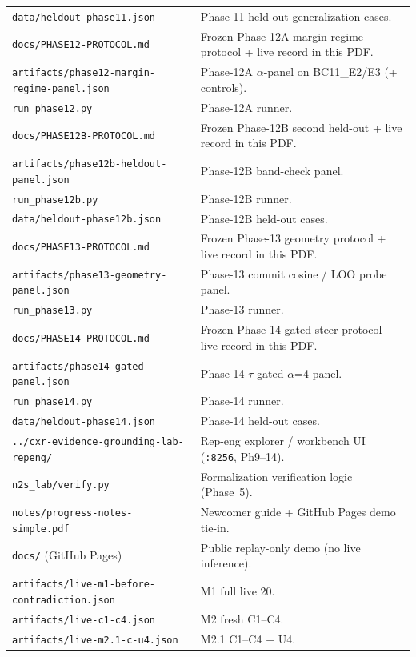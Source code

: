 \documentclass[11pt,a4paper]{article}
\begin{document}
\begin{tabularx}{\textwidth}{@{}l Y@{}}
\texttt{data/heldout-phase11.json} & Phase-11 held-out generalization cases. \\
\texttt{docs/PHASE12-PROTOCOL.md} & Frozen Phase-12A margin-regime protocol + live record in this PDF. \\
\texttt{artifacts/phase12-margin-regime-panel.json} & Phase-12A $\alpha$-panel on BC11\_E2/E3 (+ controls). \\
\texttt{run\_phase12.py} & Phase-12A runner. \\
\texttt{docs/PHASE12B-PROTOCOL.md} & Frozen Phase-12B second held-out + live record in this PDF. \\
\texttt{artifacts/phase12b-heldout-panel.json} & Phase-12B band-check panel. \\
\texttt{run\_phase12b.py} & Phase-12B runner. \\
\texttt{data/heldout-phase12b.json} & Phase-12B held-out cases. \\
\texttt{docs/PHASE13-PROTOCOL.md} & Frozen Phase-13 geometry protocol + live record in this PDF. \\
\texttt{artifacts/phase13-geometry-panel.json} & Phase-13 commit cosine / LOO probe panel. \\
\texttt{run\_phase13.py} & Phase-13 runner. \\
\texttt{docs/PHASE14-PROTOCOL.md} & Frozen Phase-14 gated-steer protocol + live record in this PDF. \\
\texttt{artifacts/phase14-gated-panel.json} & Phase-14 $\tau$-gated $\alpha$=4 panel. \\
\texttt{run\_phase14.py} & Phase-14 runner. \\
\texttt{data/heldout-phase14.json} & Phase-14 held-out cases. \\
\texttt{../cxr-evidence-grounding-lab-repeng/} & Rep-eng explorer / workbench UI (\texttt{:8256}, Ph9--14). \\
\texttt{n2s\_lab/verify.py} & Formalization verification logic (Phase~5). \\
\texttt{notes/progress-notes-simple.pdf} & Newcomer guide + GitHub Pages demo tie-in. \\
\texttt{docs/} (GitHub Pages) & Public replay-only demo (no live inference). \\
\texttt{artifacts/live-m1-before-contradiction.json} & M1 full live 20. \\
\texttt{artifacts/live-c1-c4.json} & M2 fresh C1--C4. \\
\texttt{artifacts/live-m2.1-c-u4.json} & M2.1 C1--C4 + U4. \\

\end{tabularx}
\end{document}

